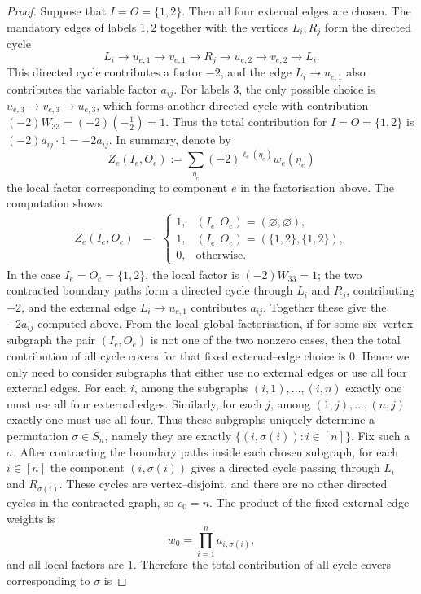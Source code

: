 \documentclass[11pt,a4paper]{article}
\begin{document}
\begin{proof}
Suppose that $I=O=\{1,2\}$. Then all four external edges are chosen. The mandatory edges of labels $1,2$ together with the vertices $L_i,R_j$ form the directed cycle
\[
  L_i\to u_{e,1}\to v_{e,1}\to R_j
  \to u_{e,2}\to v_{e,2}\to L_i .
\]
This directed cycle contributes a factor $-2$, and the edge $L_i\to u_{e,1}$ also contributes the variable factor $a_{ij}$. For labels $3$, the only possible choice is $u_{e,3}\to v_{e,3}\to u_{e,3}$, which forms another directed cycle with contribution $(-2)W_{33}=(-2)\left(-\frac12\right)=1$. Thus the total contribution for $I=O=\{1,2\}$ is $(-2)a_{ij}\cdot 1=-2a_{ij}$.
In summary, denote by
\[
  Z_e(I_e,O_e):=\sum_{\eta_e}
  (-2)^{\ell_e(\eta_e)}w_e(\eta_e)
\]
the local factor corresponding to component $e$ in the factorisation above. The computation shows
\begin{eqnarray*}
  Z_e(I_e,O_e)
  &=&\begin{cases}
    1,&(I_e,O_e)=(\varnothing,\varnothing),\\
    1,&(I_e,O_e)=(\{1,2\},\{1,2\}),\\
    0,&\text{otherwise}.
  \end{cases}
\end{eqnarray*}
In the case $I_e=O_e=\{1,2\}$, the local factor is $(-2)W_{33}=1$; the two contracted boundary paths form a directed cycle through $L_i$ and $R_j$, contributing $-2$, and the external edge $L_i\to u_{e,1}$ contributes $a_{ij}$. Together these give the $-2a_{ij}$ computed above. From the local–global factorisation, if for some six–vertex subgraph the pair $(I_e,O_e)$ is not one of the two nonzero cases, then the total contribution of all cycle covers for that fixed external–edge choice is $0$. Hence we only need to consider subgraphs that either use no external edges or use all four external edges.
For each $i$, among the subgraphs $(i,1),\ldots,(i,n)$ exactly one must use all four external edges. Similarly, for each $j$, among $(1,j),\ldots,(n,j)$ exactly one must use all four. Thus these subgraphs uniquely determine a permutation $\sigma\in S_n$, namely they are exactly $\{(i,\sigma(i)):i\in[n]\}$. Fix such a $\sigma$. After contracting the boundary paths inside each chosen subgraph, for each $i\in[n]$ the component $(i,\sigma(i))$ gives a directed cycle passing through $L_i$ and $R_{\sigma(i)}$. These cycles are vertex–disjoint, and there are no other directed cycles in the contracted graph, so $c_0=n$. The product of the fixed external edge weights is
\[
  w_0=\prod_{i=1}^n a_{i,\sigma(i)},
\]
and all local factors are $1$. Therefore the total contribution of all cycle covers corresponding to $\sigma$ is

\end{proof}
\end{document}
